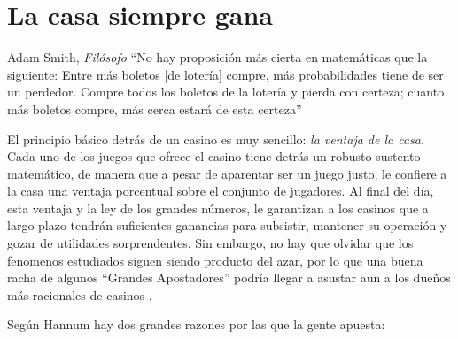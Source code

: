  \section{La casa siempre gana}



\begin{chapquote}{Adam Smith, \textit{Filósofo} \cite{smith1963wealth}}
	``No hay proposición más cierta en matemáticas que la siguiente: Entre más boletos [de lotería] compre, más probabilidades tiene de ser un perdedor. Compre todos los boletos de la lotería y pierda con certeza; cuanto más boletos compre, más cerca estará de esta certeza''
\end{chapquote}



El principio básico detrás de un casino es muy sencillo: \emph{la ventaja de la casa}. Cada uno de los juegos que ofrece el casino tiene detrás un robusto sustento matemático, de manera que a pesar de aparentar ser un juego justo, le confiere a la casa una ventaja porcentual sobre el conjunto de jugadores. Al final del día, esta ventaja y la ley de los grandes números, le garantizan a los casinos que a largo plazo tendrán suficientes ganancias para subsistir, mantener su operación y gozar de utilidades sorprendentes. Sin embargo, no hay que olvidar que los fenomenos estudiados siguen siendo producto del azar, por lo que una buena racha de algunos ``Grandes Apostadores'' podría llegar a asustar aun a los dueños  más racionales de casinos \cite{hannum2005practical}.



Según Hannum \cite{hannum2005practical} hay dos grandes razones por las que la gente apuesta:

